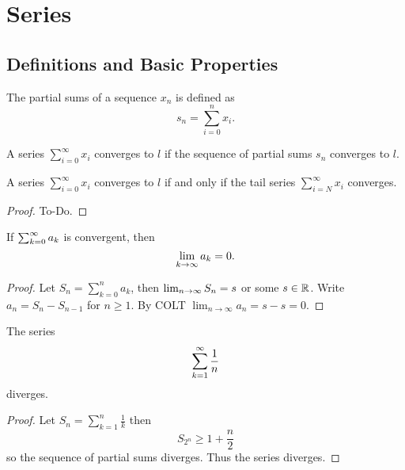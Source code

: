 \chapter{Series}\label{cha:series}

\section{Definitions and Basic Properties}

\begin{definition}\label{def:partial_sums}
   \leanok
  The partial sums of a sequence $x_n$ is defined as
  \[
  s_n = \sum_{i = 0}^{n} x_i.
  \]
\end{definition}

\begin{definition}\label{def:convergent_series}
   \leanok
  A series $\sum_{i = 0}^{\infty} x_i$ converges to $l$ if the sequence of partial sums $s_n$ converges to $l$.
\end{definition}

\begin{lemma}\label{lem:sum_tail_conv}
     \leanok
    A series $\sum_{i = 0}^{\infty} x_i$ converges to $l$ if and only if the tail series $\sum_{i = N}^{\infty} x_i$ converges.
\end{lemma}
\begin{proof}
    To-Do.
\end{proof}

\begin{lemma}\label{lem:sumifconv_seqconvtozero}
    If $\infsumo a_k$ is convergent,
    then
    \[
    \liminfty[k] a_k = 0.
    \]
\end{lemma}
\begin{proof}
    Let $S_n = \sum_{k = 0}^{n}a_k$,
    then $\liminfty S_n = s$ or some $s \in \R$.
    Write $a_n = S_n - S_{n - 1}$ for $n \geq 1$.
    By COLT
    $\lim_{n \to \infty}a_n = s - s = 0$.
\end{proof}

\begin{lemma}\label{lem:harmsumdiv}
    The series
    \[
    \infsum\frac{1}{n}
    \]
    diverges.
\end{lemma}
\begin{proof}
    Let $S_n = \sum_{k = 1}^{n}\frac{1}{k}$ then
    \[
    S_{2 ^ n} \geq 1 + \frac{n}{2}
    \]
    so the sequence of partial sums diverges.
    Thus the series diverges.
\end{proof}


